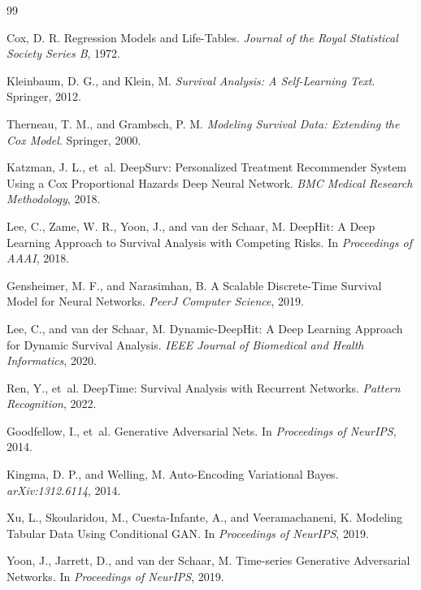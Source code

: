 \documentclass[twoside]{article}
\begin{document}
\begin{thebibliography}{99}
	
	Cox, D. R.
	Regression Models and Life-Tables.
	\textit{Journal of the Royal Statistical Society Series B}, 1972.
	
	Kleinbaum, D. G., and Klein, M.
	\textit{Survival Analysis: A Self-Learning Text}.
	Springer, 2012.
	
	Therneau, T. M., and Grambsch, P. M.
	\textit{Modeling Survival Data: Extending the Cox Model}.
	Springer, 2000.
	
	Katzman, J. L., et~al.
	DeepSurv: Personalized Treatment Recommender System Using a Cox Proportional Hazards Deep Neural Network.
	\textit{BMC Medical Research Methodology}, 2018.
	
	Lee, C., Zame, W. R., Yoon, J., and van der Schaar, M.
	DeepHit: A Deep Learning Approach to Survival Analysis with Competing Risks.
	In \textit{Proceedings of AAAI}, 2018.
	
	Gensheimer, M. F., and Narasimhan, B.
	A Scalable Discrete-Time Survival Model for Neural Networks.
	\textit{PeerJ Computer Science}, 2019.
	
	Lee, C., and van der Schaar, M.
	Dynamic-DeepHit: A Deep Learning Approach for Dynamic Survival Analysis.
	\textit{IEEE Journal of Biomedical and Health Informatics}, 2020.
	
	Ren, Y., et~al.
	DeepTime: Survival Analysis with Recurrent Networks.
	\textit{Pattern Recognition}, 2022.
	
	Goodfellow, I., et~al.
	Generative Adversarial Nets.
	In \textit{Proceedings of NeurIPS}, 2014.
	
	Kingma, D. P., and Welling, M.
	Auto-Encoding Variational Bayes.
	\textit{arXiv:1312.6114}, 2014.
	
	Xu, L., Skoularidou, M., Cuesta-Infante, A., and Veeramachaneni, K.
	Modeling Tabular Data Using Conditional GAN.
	In \textit{Proceedings of NeurIPS}, 2019.
	
	Yoon, J., Jarrett, D., and van der Schaar, M.
	Time-series Generative Adversarial Networks.
	In \textit{Proceedings of NeurIPS}, 2019.
	

\end{thebibliography}
\end{document}

